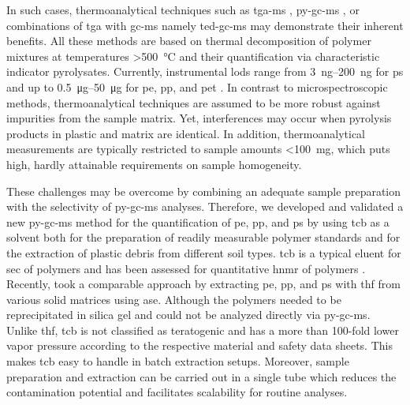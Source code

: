 In such cases, thermoanalytical techniques such as \ac{tga-ms} \citep[Chapter~\ref{ch:tga-ms-method};][]{DavidIntroducing2019}, \ac{py-gc-ms} \citep{FischerSimultaneous2017,FischerMicroplastics2019}, or combinations of \ac{tga} with \acs{gc-ms} namely \ac{ted-gc-ms} \citep{DumichenAnalysis2015,DuemichenAutomated2019} may demonstrate their inherent benefits. All these methods are based on thermal decomposition of polymer mixtures at temperatures \SI{>500}{\degreeCelsius} and their quantification via characteristic indicator pyrolysates. Currently, instrumental \acp{lod} range from \SIrange[range-phrase = { to }]{3}{200}{\nano\gram} for \ac{ps} \citep{FischerMicroplastics2019,DuemichenAutomated2019} and up to \SIrange{0.5}{50}{\micro\gram} for \ac{pe}, \ac{pp}, and \ac{pet} \citep[Chapter~\ref{ch:tga-ms-method};][]{DuemichenAutomated2019}. In contrast to microspectroscopic methods, thermoanalytical techniques are assumed to be more robust against impurities from the sample matrix. Yet, interferences may occur when pyrolysis products in plastic and matrix are identical. In addition, thermoanalytical measurements are typically restricted to sample amounts \SI{<100}{\milli\gram}, which puts high, hardly attainable requirements on sample homogeneity.

These challenges may be overcome by combining an adequate sample preparation with the selectivity of \ac{py-gc-ms} analyses. Therefore, we developed and validated a new \ac{py-gc-ms} method for the quantification of \ac{pe}, \ac{pp}, and \ac{ps} by using \ac{tcb} as a solvent both for the preparation of readily measurable polymer standards and for the extraction of plastic debris from different soil types. \Ac{tcb} is a typical eluent for \ac{sec} of polymers \citep{BivensPolymertoSolvent2016} and has been assessed for quantitative \ac{hnmr} of polymers \citep{PeezFirst2019}. Recently, \citet{DierkesQuantification2019} took a comparable approach by extracting \ac{pe}, \ac{pp}, and \ac{ps} with \ac{thf} from various solid matrices using \ac{ase}. Although the polymers needed to be reprecipitated in silica gel and could not be analyzed directly via \ac{py-gc-ms}. Unlike \ac{thf}, \ac{tcb} is not classified as teratogenic and has a more than 100-fold lower vapor pressure according to the respective material and safety data sheets. This makes \ac{tcb} easy to handle in batch extraction setups. Moreover, sample preparation and extraction can be carried out in a single tube which reduces the contamination potential and facilitates scalability for routine analyses.

